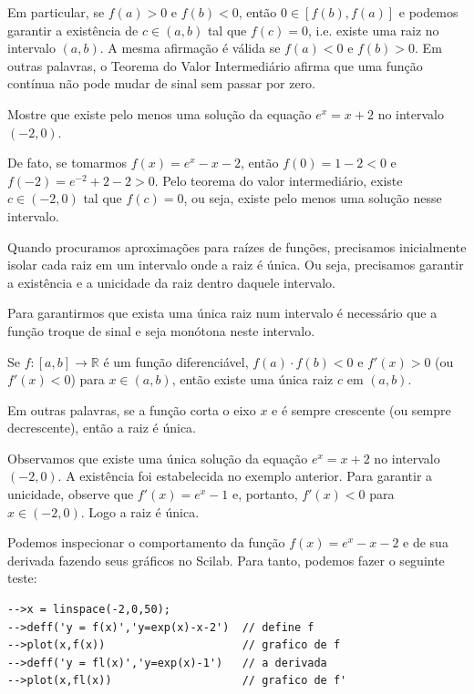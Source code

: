 Em particular, se $f(a)>0$ e $f(b)<0$, então $0\in [f(b),f(a)]$ e podemos garantir a existência de $c\in(a,b)$ tal que $f(c)=0$, i.e. existe uma raiz no intervalo $(a,b)$. A mesma afirmação é válida se $f(a)<0$ e $f(b)>0$. Em outras palavras, o Teorema do Valor Intermediário afirma que uma função contínua não pode mudar de sinal sem passar por zero.

\begin{ex}
Mostre que existe pelo menos uma solução da equação $e^x=x+2$ no intervalo $(-2,0)$.

De fato, se tomarmos $f(x)=e^x-x-2$, então $f(0)=1-2<0$ e $f(-2)=e^{-2}+2-2>0$. Pelo teorema do valor intermediário, existe $c\in(-2,0)$ tal que $f(c)=0$, ou seja, existe pelo menos uma solução nesse intervalo.
\end{ex}
Quando procuramos aproximações para raízes de funções, precisamos inicialmente isolar cada raiz em um intervalo onde a raiz é única. Ou seja, precisamos garantir a existência e a unicidade da raiz dentro daquele intervalo.

Para garantirmos que exista uma única raiz num intervalo é necessário que a função troque de sinal e seja monótona neste intervalo.

\begin{teo}
Se $f:[a,b]\to\mathbb{R}$ é um função diferenciável, $f(a)\cdot f(b)<0$ e $f'(x)>0$ (ou $f'(x)<0$) para $x\in(a,b)$, então existe uma única raiz $c$ em $(a,b)$.
\end{teo}

Em outras palavras, se a função corta o eixo $x$ e é sempre crescente (ou sempre decrescente), então a raiz é única.
\begin{ex}
Observamos que existe uma única solução da equação $e^x=x+2$ no intervalo $(-2,0)$. A existência foi estabelecida no exemplo anterior. Para garantir a unicidade, observe que $f'(x)=e^x-1$ e, portanto, $f'(x)<0$ para $x\in(-2,0)$. Logo a raiz é única.

\ifisscilab
Podemos inspecionar o comportamento da função $f(x)= e^x - x - 2$ e de sua derivada fazendo seus gráficos no Scilab. Para tanto, podemos fazer o seguinte teste:
\begin{verbatim}
-->x = linspace(-2,0,50);
-->deff('y = f(x)','y=exp(x)-x-2')  // define f
-->plot(x,f(x))                     // grafico de f
-->deff('y = fl(x)','y=exp(x)-1')   // a derivada
-->plot(x,fl(x))                    // grafico de f'
\end{verbatim}
\fi
\end{ex}

